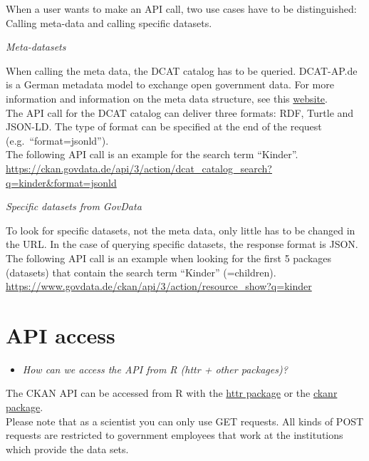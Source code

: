 \documentclass[
]{book}
\providecommand{\tightlist}{%
  \setlength{\itemsep}{0pt}\setlength{\parskip}{0pt}}
\begin{document}
When a user wants to make an API call, two use cases have to be distinguished: Calling meta-data and calling specific datasets.

\emph{Meta-datasets}

When calling the meta data, the DCAT catalog has to be queried. DCAT-AP.de is a German metadata model to exchange open government data. For more information and information on the meta data structure, see this \href{https://www.dcat-ap.de/}{website}.\\
The API call for the DCAT catalog can deliver three formats: RDF, Turtle and JSON-LD. The type of format can be specified at the end of the request (e.g.~``format=jsonld'').\\
The following API call is an example for the search term ``Kinder''.
\url{https://ckan.govdata.de/api/3/action/dcat_catalog_search?q=kinder\&format=jsonld}

\emph{Specific datasets from GovData}

To look for specific datasets, not the meta data, only little has to be changed in the URL. In the case of querying specific datasets, the response format is JSON.
The following API call is an example when looking for the first 5 packages (datasets) that contain the search term ``Kinder'' (=children).\\
\url{https://www.govdata.de/ckan/api/3/action/resource_show?q=kinder}

\hypertarget{api-access-9}{%
\section{API access}\label{api-access-9}}

\begin{itemize}
\tightlist
\item
  \emph{How can we access the API from R (httr + other packages)?}
\end{itemize}

The CKAN API can be accessed from R with the \href{https://cran.r-project.org/web/packages/httr/vignettes/quickstart.html}{httr package} or the \href{https://cran.r-project.org/web/packages/ckanr/ckanr.pdf}{ckanr package}.\\
Please note that as a scientist you can only use GET requests. All kinds of POST requests are restricted to government employees that work at the institutions which provide the data sets.
\end{document}
